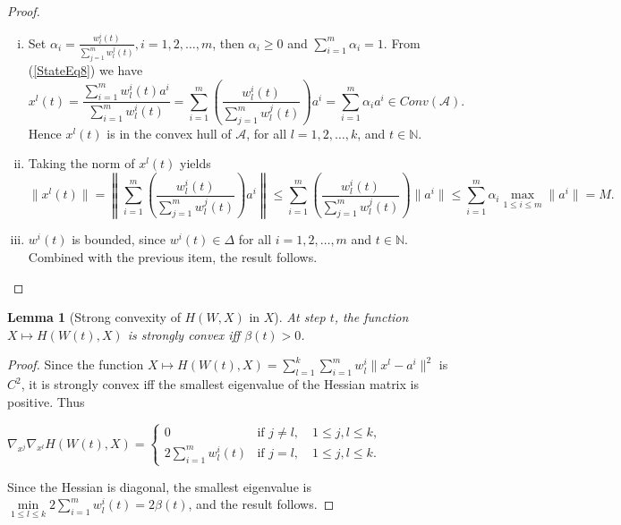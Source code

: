 \documentclass[11pt]{article}
\numberwithin{equation}{section}
\newtheorem{lemma}{Lemma}[proposition]
\begin{document}
\begin{proof}
\begin{enumerate}[(i)]
	\item  Set $\alpha_i = \frac{ w^i_l(t)}{\sum_{j=1}^{m} w^j_l(t)}, i=1, 2, \ldots ,m$, then $\alpha_i \geq 0$ and $\sum\limits_{i=1}^{m} \alpha_i =1$. From (\ref{StateEq8}) we have
	\begin{equation*}
		x^l(t) = \frac{\sum_{i=1}^{m} w^i_l(t) a^i}{\sum_{i=1}^{m} w^i_l(t)} 
		= \sum_{i=1}^{m} \left( \frac{ w^i_l(t)}{\sum_{j=1}^{m} w^j_l(t)} \right) a^i 
		= \sum\limits_{i=1}^{m} \alpha_i a^i \in Conv(\mathcal{A}).
	\end{equation*}
	Hence $x^l(t)$ is in the convex hull of $\mathcal{A}$, for all $l = 1, 2, \ldots, k$, and $t \in \mathbb{N}$.

	\item
	Taking the norm of $x^l(t)$ yields 
	\begin{equation*}
		\| x^l(t) \| = \left\lVert \sum_{i=1}^{m} \left( \frac{ w^i_l(t)}{\sum_{j=1}^{m} w^j_l(t)} \right) a^i \right\lVert
		\leq \sum_{i=1}^{m} \left( \frac{ w^i_l(t)}{\sum_{j=1}^{m} w^j_l(t)} \right) \| a^i \|
		\leq \sum_{i=1}^{m} \alpha_i \max\limits_{1 \leq i \leq m} \| a^i \| = M .
	\end{equation*}
	\item $w^i(t)$ is bounded, since $w^i(t) \in \Delta$ for all $i=1, 2, \ldots ,m$ and $t \in \mathbb{N}$. Combined with the previous item, the result follows. 
\end{enumerate}
\end{proof}

\begin{lemma}[Strong convexity of $H(W,X)$ in $X$] \label{StateEq14}
At step $t$, the function $X \mapsto H(W(t),X)$ is strongly convex iff $\beta(t) > 0$.
\end{lemma}

\begin{proof}
Since the function $X \mapsto H(W(t),X) = 
\sum\limits_{l=1}^{k} \sum\limits_{i=1}^{m} w^i_l \|x^l - a^i\|^2$ is $C^2$, it is strongly convex iff the smallest eigenvalue of the Hessian matrix is positive. Thus

\begin{center}
$\nabla_{x^j} \nabla_{x^l} H(W(t),X) = 
\begin{cases} 0 &\mbox{if } j \neq l, \quad 1 \leq j,l \leq k ,
\\ 2\sum\limits_{i=1}^{m} w^i_l(t) &\mbox{if } j = l, \quad 1 \leq j,l \leq k. \end{cases} $
\end{center}

Since the Hessian is diagonal, the smallest eigenvalue is $\min\limits_{1 \leq l \leq k} 2\sum\limits_{i=1}^{m} w^i_l(t) = 2\beta(t)$, and the result follows.
\end{proof}
\end{document}
